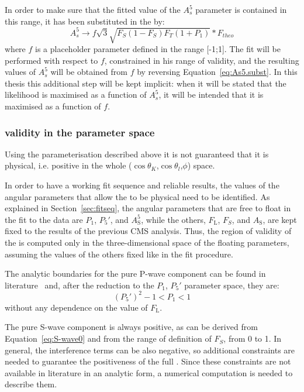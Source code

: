 In order to make sure that the fitted value of the $A_s^5$ parameter is contained in this range, it has been substituted in the \pdf by:
\begin{equation} \label{eq:As5.subst}
  A^5_s\to f\sqrt{3}\sqrt{F_S(1-F_S)F_T(1+P_1)}*F_{theo}
\end{equation}
where $f$ is a placeholder parameter defined in the range [-1;1].
The fit will be performed with respect to $f$, constrained in his range of validity, and the resulting values of $A_s^5$ will be obtained from $f$ by reversing Equation~\ref{eq:As5.subst}.
In this thesis this additional step will be kept implicit: when it will be stated that the likelihood is maximised as a function of $A_s^5$, it will be intended that it is maximised as a function of $f$.

\subsubsection{\pdf validity in the parameter space}
\label{sec:phys.bound}
Using the \pdf parameterisation described above it is not guaranteed that it is physical, i.e. positive in the whole ($\cos\theta_K$,$\cos\theta_l$,$\phi$) space.

In order to have a working fit sequence and reliable results, the values of the angular parameters that allow the \pdf to be physical need to be identified.
As explained in Section~\ref{sec:fitseq}, the angular parameters that are free to float in the fit to the data are $P_1$, $P_5'$, and $A^5_\mathrm{S}$, while the others, $F_\mathrm{L}$, $F_S$, and $A_\mathrm{S}$, are kept fixed to the results of the previous CMS analysis.
Thus, the region of validity of the \pdf is computed only in the three-dimensional space of the floating parameters, assuming the values of the others fixed like in the fit procedure.

The analytic boundaries for the pure P-wave component can be found in literature~\cite{Matias:2014jua} and, after the reduction to the $P_1$, $P_5'$ parameter space, they are:
\begin{equation} \label{eq:anal.bound}
  (P_5')^2 - 1 < P_1 < 1
\end{equation}
without any dependence on the value of $F_\mathrm{L}$.

The pure S-wave component is always positive, as can be derived from Equation~\ref{eq:S-wave0} and from the range of definition of $F_S$, from 0 to 1.
In general, the interference terms can be also negative, so additional constraints are needed to guarantee the positiveness of the full \pdf.
Since these constraints are not available in literature in an analytic form, a numerical computation is needed to describe them.

